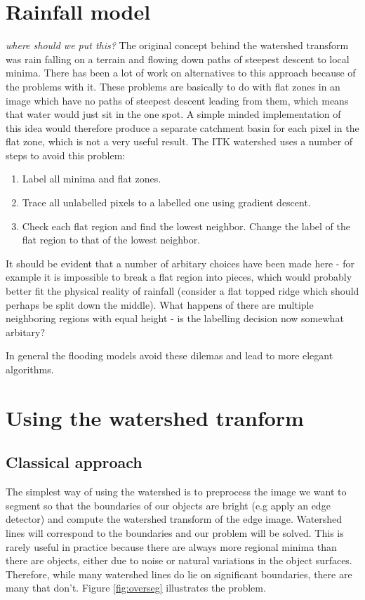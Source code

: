 \documentclass{InsightArticle}
\begin{document}
\section{Rainfall model}
\label{sect:rainfall}
{\em where should we put this?}  The original concept behind the
watershed transform was rain falling on a terrain and flowing down
paths of steepest descent to local minima. There has been a lot of
work on alternatives to this approach because of the problems with
it. These problems are basically to do with flat zones in an image
which have no paths of steepest descent leading from them, which means
that water would just sit in the one spot. A simple minded
implementation of this idea would therefore produce a separate
catchment basin for each pixel in the flat zone, which is not a very
useful result. The ITK watershed uses a number of steps to avoid this problem:
\begin{enumerate}
\item Label all minima and flat zones.
\item Trace all unlabelled pixels to a labelled one using gradient descent.
\item Check each flat region and find the lowest neighbor. Change the label of the flat region to that of the lowest neighbor.
\end{enumerate}
 
It should be evident that a number of arbitary choices have been made
here - for example it is impossible to break a flat region into
pieces, which would probably better fit the physical reality of
rainfall (consider a flat topped ridge which should perhaps be split
down the middle). What happens of there are multiple neighboring
regions with equal height - is the labelling decision now somewhat arbitary?

In general the flooding models avoid these dilemas and lead to more
elegant algorithms.


\section{Using the watershed tranform}
\label{sect:usingWT}
\subsection{Classical approach}
The simplest way of using the watershed is to preprocess the image we
want to segment so that the boundaries of our objects are bright (e.g
apply an edge detector) and compute the watershed transform of the
edge image. Watershed lines will correspond to the boundaries and our
problem will be solved. This is rarely useful in practice because
there are always more regional minima than there are objects, either
due to noise or natural variations in the object surfaces. Therefore,
while many watershed lines do lie on significant boundaries, there are
many that don't. Figure \ref{fig:overseg} illustrates the problem. 
\end{document}

